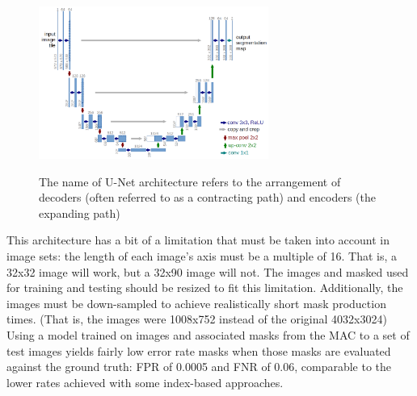 \documentclass[letterpaper]{report}
\begin{document}
{\begin{figure}[H]
	\centering
	\includegraphics[height=5cm]{figures/u-net-architecture.png}
	\label{fig:u-net}
	\caption[U-Net architecture]{The name of U-Net architecture refers to the arrangement of decoders (often referred to as a contracting path) and encoders (the expanding path)}
\end{figure}
This architecture has a bit of a limitation that must be taken into account in image sets: the length of each image's axis must be a multiple of 16. That is, a 32x32 image will work, but a 32x90 image will not. The images and masked used for training and testing should be resized to fit this limitation. Additionally, the images must be down-sampled to achieve realistically short mask production times. (That is, the images were 1008x752 instead of the original 4032x3024) Using a model trained on images and associated masks from the MAC to a set of test images yields fairly low error rate masks when  those masks are evaluated against the ground truth: FPR of 0.0005 and FNR of 0.06, comparable to the lower rates achieved with some index-based approaches.

}
\end{document}
